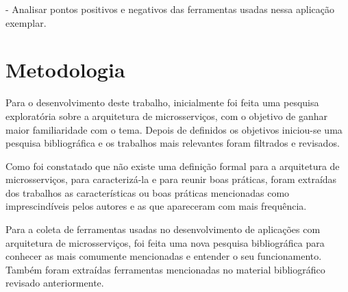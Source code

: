 - Analisar pontos positivos e negativos das ferramentas usadas nessa aplicação exemplar.

\section{Metodologia}

Para o desenvolvimento deste trabalho, inicialmente foi feita uma pesquisa exploratória sobre a arquitetura de microsserviços, com o objetivo de ganhar maior familiaridade com o tema. Depois de definidos os objetivos iniciou-se uma pesquisa bibliográfica e os trabalhos mais relevantes foram filtrados e revisados. 

Como foi constatado que não existe uma definição formal para a arquitetura de microsserviços, para caracterizá-la e para reunir boas práticas, foram extraídas dos trabalhos as características ou boas práticas mencionadas como imprescindíveis pelos autores e as que apareceram com mais frequência. 

Para a coleta de ferramentas usadas no desenvolvimento de aplicações com arquitetura de microsserviços, foi feita uma nova pesquisa bibliográfica para conhecer as mais comumente mencionadas e entender o seu funcionamento. Também foram extraídas ferramentas mencionadas no material bibliográfico revisado anteriormente.  






